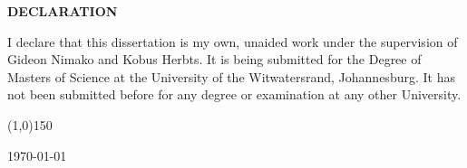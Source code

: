 \cleardoublepage
\pagestyle{plain}
\begin{center}
{\Large\textbf{DECLARATION}}
\end{center}
\renewcommand{\baselinestretch}{1.50}\normalsize
I declare that this dissertation is my own, unaided work under the supervision of Gideon Nimako and Kobus Herbts.  It is being submitted for the Degree of Masters of Science at the University of the Witwatersrand, Johannesburg.  It has not been submitted before for any degree or examination at any other University.


\vspace{5mm}

\line(1,0){150}

\vspace{5mm}

\today





